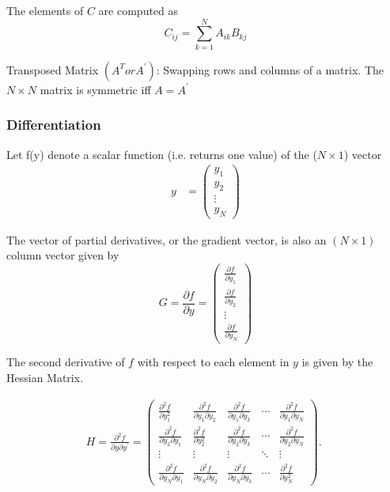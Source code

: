 \documentclass[11pt]{article}
\begin{document}
The elements of $C$ are computed as
\[ C_{ij} = \sum_{k=1}^N A_{ik}B_{kj}\]

Transposed Matrix $(A^T or A^\prime)$: Swapping rows and columns of a matrix. The $N \times N$ matrix is symmetric iff $A = A^\prime$

\subsubsection*{Differentiation}

Let f(y) denote a scalar function (i.e. returns one value) of the ($N \times 1$) vector
\begin{align*}
    y &= \begin{pmatrix}
    y_1 \\
    y_2\\
    \vdots \\
    y_N
    \end{pmatrix}
\end{align*}

The vector of partial derivatives, or the gradient vector, is also an $(N\times1)$ column vector given by 
\begin{equation}
\label{gradient vector}
G=\frac{\partial f}{\partial y}=\left(\begin{array}{c}
\frac{\partial f}{\partial y_1} \\
\frac{\partial f}{\partial y_2} \\
\vdots \\
\frac{\partial f}{\partial y_N}
\end{array}\right)
\end{equation}

The second derivative of $f$ with respect to each element in $y$ is given by the Hessian Matrix.

\begin{align*}
\label{hessian}
H=\frac{\partial^2 f}{\partial y \partial y^{\prime}}=\left(\begin{array}{ccccc}
\frac{\partial^2 f}{\partial y_1^2} & \frac{\partial^2 f}{\partial y_1 \partial y_2} & \frac{\partial^2 f}{\partial y_1 \partial y_3} & \cdots & \frac{\partial^2 f}{\partial y_1 \partial y_N} \\
\frac{\partial^2 f}{\partial y_2 \partial y_1} & \frac{\partial^2 f}{\partial y_2^2} & \frac{\partial^2 f}{\partial y_2 \partial y_3} & \cdots & \frac{\partial^2 f}{\partial y_2 \partial y_N} \\
\vdots & \vdots & \vdots & \ddots & \vdots \\
\frac{\partial^2 f}{\partial y_N \partial y_1} & \frac{\partial^2 f}{\partial y_N \partial y_2} & \frac{\partial^2 f}{\partial y_N \partial y_3} & \cdots & \frac{\partial^2 f}{\partial y_N^2}
\end{array}\right) \text {. }
\end{align*}
\end{document}
